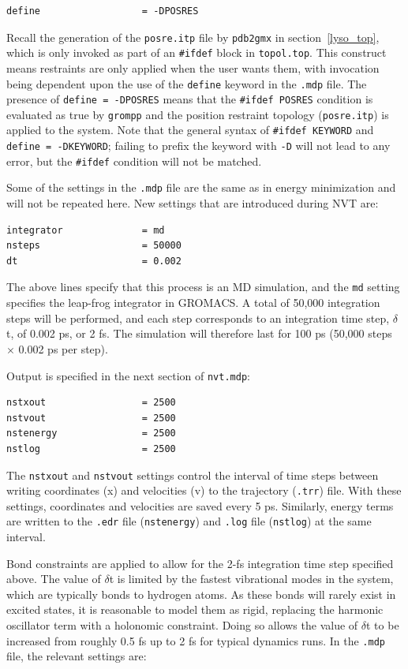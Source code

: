 \documentclass[9pt,tutorial,pubversion]{livecoms}
\begin{document}
\begin{lstlisting}
define                  = -DPOSRES
\end{lstlisting}
%
Recall the generation of the \texttt{posre.itp} file by \texttt{pdb2gmx} in section~\ref{lyso_top}, which is only invoked as part of an \texttt{\#ifdef} block in \texttt{topol.top}. This construct means restraints are only applied when the user wants them, with invocation being dependent upon the use of the \texttt{define} keyword in the \texttt{.mdp} file. The presence of \texttt{define = -DPOSRES} means that the \texttt{\#ifdef POSRES} condition is evaluated as true by \texttt{grompp} and the position restraint topology (\texttt{posre.itp}) is applied to the system. Note that the general syntax of \texttt{\#ifdef KEYWORD} and \texttt{define = -DKEYWORD}; failing to prefix the keyword with \texttt{-D} will not lead to any error, but the \texttt{\#ifdef} condition will not be matched.

Some of the settings in the \texttt{.mdp} file are the same as in energy minimization and will not be repeated here. New settings that are introduced during NVT are:

\begin{lstlisting}
integrator              = md
nsteps                  = 50000
dt                      = 0.002
\end{lstlisting}
%
The above lines specify that this process is an MD simulation, and the \texttt{md} setting specifies the leap-frog integrator in GROMACS. A total of 50,000 integration steps will be performed, and each step corresponds to an integration time step, $\delta$t, of 0.002 ps, or 2 fs. The simulation will therefore last for 100 ps (50,000 steps $\times$ 0.002 ps per step).

Output is specified in the next section of \texttt{nvt.mdp}:

\begin{lstlisting}
nstxout                 = 2500
nstvout                 = 2500
nstenergy               = 2500
nstlog                  = 2500
\end{lstlisting}
%
The \texttt{nstxout} and \texttt{nstvout} settings control the interval of time steps between writing coordinates (x) and velocities (v) to the trajectory (\texttt{.trr}) file. With these settings, coordinates and velocities are saved every 5 ps. Similarly, energy terms are written to the \texttt{.edr} file (\texttt{nstenergy}) and \texttt{.log} file (\texttt{nstlog}) at the same interval.

Bond constraints are applied to allow for the 2-fs integration time step specified above. The value of $\delta$t is limited by the fastest vibrational modes in the system, which are typically bonds to hydrogen atoms. As these bonds will rarely exist in excited states, it is reasonable to model them as rigid, replacing the harmonic oscillator term with a holonomic constraint. Doing so allows the value of $\delta$t to be increased from roughly 0.5 fs up to 2 fs for typical dynamics runs. In the \texttt{.mdp} file, the relevant settings are:
\end{document}
